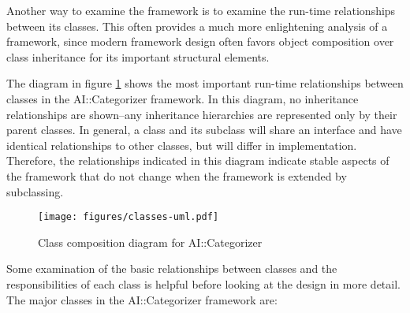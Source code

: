 \documentclass[a4paper]{report}
\begin{document}
Another way to examine the framework is to examine the run-time
relationships between its classes.  This often provides a much more
enlightening analysis of a framework, since modern framework design
often favors object composition over class inheritance for its
important structural elements. \cite[p. 20]{gamma:95}

The diagram in figure \ref{classes-uml} shows the
most important run-time relationships between classes in the
AI::Categorizer framework.  In this diagram, no inheritance
relationships are shown--any inheritance hierarchies are represented
only by their parent classes.  In general, a class and its subclass
will share an interface and have identical relationships to other
classes, but will differ in implementation.  Therefore, the
relationships indicated in this diagram indicate stable aspects of the
framework that do not change when the framework is extended by
subclassing.

\begin{figure}
\texttt{[image: figures/classes-uml.pdf]}
\caption{Class composition diagram for AI::Categorizer}
\label{classes-uml}
\end{figure}

Some examination of the basic relationships between classes and the
responsibilities of each class is helpful before looking at the design
in more detail.  The major classes in the AI::Categorizer framework
are:
\end{document}
